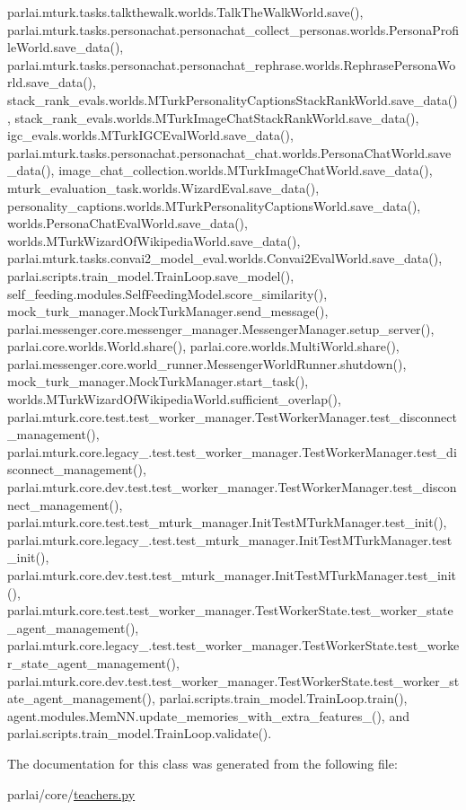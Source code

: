 parlai.\+mturk.\+tasks.\+talkthewalk.\+worlds.\+Talk\+The\+Walk\+World.\+save(), parlai.\+mturk.\+tasks.\+personachat.\+personachat\+\_\+collect\+\_\+personas.\+worlds.\+Persona\+Profile\+World.\+save\+\_\+data(), parlai.\+mturk.\+tasks.\+personachat.\+personachat\+\_\+rephrase.\+worlds.\+Rephrase\+Persona\+World.\+save\+\_\+data(), stack\+\_\+rank\+\_\+evals.\+worlds.\+M\+Turk\+Personality\+Captions\+Stack\+Rank\+World.\+save\+\_\+data(), stack\+\_\+rank\+\_\+evals.\+worlds.\+M\+Turk\+Image\+Chat\+Stack\+Rank\+World.\+save\+\_\+data(), igc\+\_\+evals.\+worlds.\+M\+Turk\+I\+G\+C\+Eval\+World.\+save\+\_\+data(), parlai.\+mturk.\+tasks.\+personachat.\+personachat\+\_\+chat.\+worlds.\+Persona\+Chat\+World.\+save\+\_\+data(), image\+\_\+chat\+\_\+collection.\+worlds.\+M\+Turk\+Image\+Chat\+World.\+save\+\_\+data(), mturk\+\_\+evaluation\+\_\+task.\+worlds.\+Wizard\+Eval.\+save\+\_\+data(), personality\+\_\+captions.\+worlds.\+M\+Turk\+Personality\+Captions\+World.\+save\+\_\+data(), worlds.\+Persona\+Chat\+Eval\+World.\+save\+\_\+data(), worlds.\+M\+Turk\+Wizard\+Of\+Wikipedia\+World.\+save\+\_\+data(), parlai.\+mturk.\+tasks.\+convai2\+\_\+model\+\_\+eval.\+worlds.\+Convai2\+Eval\+World.\+save\+\_\+data(), parlai.\+scripts.\+train\+\_\+model.\+Train\+Loop.\+save\+\_\+model(), self\+\_\+feeding.\+modules.\+Self\+Feeding\+Model.\+score\+\_\+similarity(), mock\+\_\+turk\+\_\+manager.\+Mock\+Turk\+Manager.\+send\+\_\+message(), parlai.\+messenger.\+core.\+messenger\+\_\+manager.\+Messenger\+Manager.\+setup\+\_\+server(), parlai.\+core.\+worlds.\+World.\+share(), parlai.\+core.\+worlds.\+Multi\+World.\+share(), parlai.\+messenger.\+core.\+world\+\_\+runner.\+Messenger\+World\+Runner.\+shutdown(), mock\+\_\+turk\+\_\+manager.\+Mock\+Turk\+Manager.\+start\+\_\+task(), worlds.\+M\+Turk\+Wizard\+Of\+Wikipedia\+World.\+sufficient\+\_\+overlap(), parlai.\+mturk.\+core.\+test.\+test\+\_\+worker\+\_\+manager.\+Test\+Worker\+Manager.\+test\+\_\+disconnect\+\_\+management(), parlai.\+mturk.\+core.\+legacy\+\_.\+test.\+test\+\_\+worker\+\_\+manager.\+Test\+Worker\+Manager.\+test\+\_\+disconnect\+\_\+management(), parlai.\+mturk.\+core.\+dev.\+test.\+test\+\_\+worker\+\_\+manager.\+Test\+Worker\+Manager.\+test\+\_\+disconnect\+\_\+management(), parlai.\+mturk.\+core.\+test.\+test\+\_\+mturk\+\_\+manager.\+Init\+Test\+M\+Turk\+Manager.\+test\+\_\+init(), parlai.\+mturk.\+core.\+legacy\+\_.\+test.\+test\+\_\+mturk\+\_\+manager.\+Init\+Test\+M\+Turk\+Manager.\+test\+\_\+init(), parlai.\+mturk.\+core.\+dev.\+test.\+test\+\_\+mturk\+\_\+manager.\+Init\+Test\+M\+Turk\+Manager.\+test\+\_\+init(), parlai.\+mturk.\+core.\+test.\+test\+\_\+worker\+\_\+manager.\+Test\+Worker\+State.\+test\+\_\+worker\+\_\+state\+\_\+agent\+\_\+management(), parlai.\+mturk.\+core.\+legacy\+\_.\+test.\+test\+\_\+worker\+\_\+manager.\+Test\+Worker\+State.\+test\+\_\+worker\+\_\+state\+\_\+agent\+\_\+management(), parlai.\+mturk.\+core.\+dev.\+test.\+test\+\_\+worker\+\_\+manager.\+Test\+Worker\+State.\+test\+\_\+worker\+\_\+state\+\_\+agent\+\_\+management(), parlai.\+scripts.\+train\+\_\+model.\+Train\+Loop.\+train(), agent.\+modules.\+Mem\+N\+N.\+update\+\_\+memories\+\_\+with\+\_\+extra\+\_\+features\+\_\+(), and parlai.\+scripts.\+train\+\_\+model.\+Train\+Loop.\+validate().



The documentation for this class was generated from the following file\+:\begin{DoxyCompactItemize}
\item 
parlai/core/\hyperlink{teachers_8py}{teachers.\+py}\end{DoxyCompactItemize}
